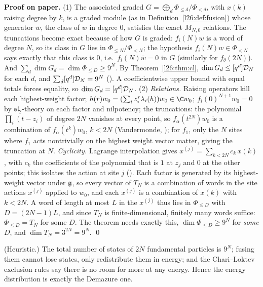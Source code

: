 \textbf{Proof on paper.} (1) The associated graded $G=\bigoplus_d\Phi_{\le d}/\Phi_{<d}$, with $x(k)$ raising degree by $k$, is a
graded module (as in Definition~\ref{l26:def:fusion}) whose generator $\bar w$, the class of $w$ in degree $0$, satisfies the exact
$M_{N,0}$ relations. The truncations become exact because of how $G$ is graded: $f_i(N)w$ is a word of degree $N$, so its class in
$G$ lies in $\Phi_{\le N}/\Phi_{<N}$; the hypothesis $f_i(N)w\in\Phi_{<N}$ says exactly that this class is $0$, i.e.\
$f_i(N)\bar w=0$ in $G$ (similarly for $f_\theta(2N)$). And $\sum_d\dim G_d=\dim\Phi_{\le D}\ge9^N$. By Theorem~\ref{l26:thm:cl}, $\dim G_d\le[q^d]\mathcal D_N$
for each $d$, and $\sum_d[q^d]\mathcal D_N=9^N$ (\lean{demazureHilb_sum}). A coefficientwise upper bound with equal totals
forces equality, so $\dim G_d=[q^d]\mathcal D_N$. (2) \emph{Relations.} Raising operators kill each highest-weight factor;
$h(r)w_0=(\sum_iz_i^r\lambda_i(h))w_0\in\C w_0$; $f_i(0)^{N+1}w_0=0$ by $\mathfrak{sl}_2$-theory on each factor and
nilpotency; the truncations: the polynomial $\prod_i(t-z_i)$ of degree $2N$ vanishes at every point, so
$f_\alpha(t^{2N})w_0$ is a combination of $f_\alpha(t^k)w_0$, $k<2N$ (Vandermonde, \lean{vand}); for $f_1$, only the $N$
sites where $f_1$ acts nontrivially on the highest weight vector matter, giving the truncation at $N$. \emph{Cyclicity.}
Lagrange interpolation gives $x^{(j)}=\sum_{k<2N}c_k\,x(k)$, with $c_k$ the coefficients of the polynomial that is $1$ at $z_j$ and $0$
at the other points; this isolates the action at site $j$ (\lean{loc_eq_sum}). Each factor is generated by its highest-weight vector
under $\mathfrak g$, so every vector of $T_N$ is a combination of words in the site actions $x^{(j)}$ applied to $w_0$, and each
$x^{(j)}$ is a combination of $x(k)$ with $k<2N$. A word of length at most $L$ in the $x^{(j)}$ thus lies in $\Phi_{\le D}$ with
$D=(2N-1)L$, and since $T_N$ is finite-dimensional, finitely many words suffice: $\Phi_{\le D}=T_N$ for some $D$. The theorem needs
exactly this, $\dim\Phi_{\le D}\ge9^N$ for \emph{some} $D$, and $\dim T_N=3^{2N}=9^N$. \qed

\begin{physics}
(Heuristic.) The total number of states of $2N$ fundamental particles is $9^N$; fusing them cannot lose states, only redistribute them
in energy; and the Chari--Loktev exclusion rules say there is no room for more at any energy. Hence the energy
distribution is exactly the Demazure one.
\end{physics}

